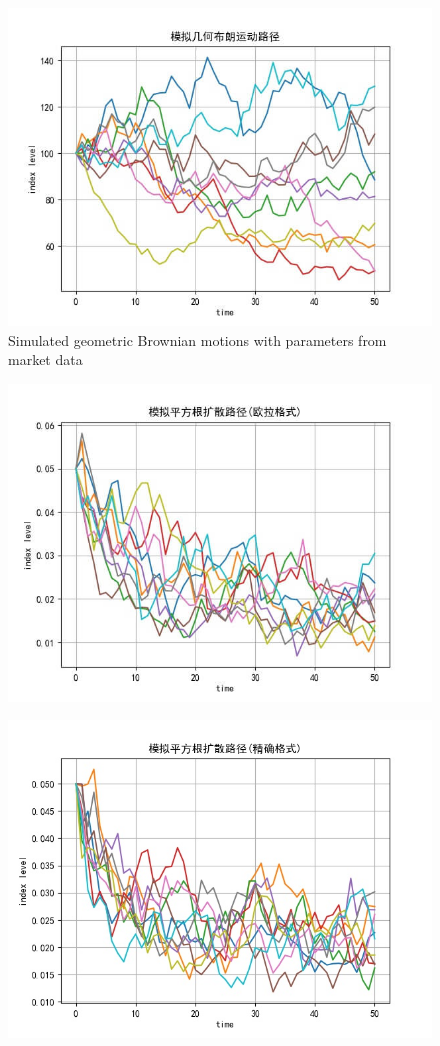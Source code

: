 \begin{figure}[H]
    \centering
    \includegraphics[width=.7\textwidth]{figures/2019-11-13-black-scholes-1}
    \caption{Simulated geometric Brownian motions with parameters from market data}\label{F:black-scholes-1}
\end{figure}

\begin{figure}[H]
    \centering
    \includegraphics[width=.7\textwidth]{figures/2019-11-13-black-scholes-2}
\end{figure}

\begin{figure}[H]
    \centering
    \includegraphics[width=.7\textwidth]{figures/2019-11-13-black-scholes-3}
\end{figure}

